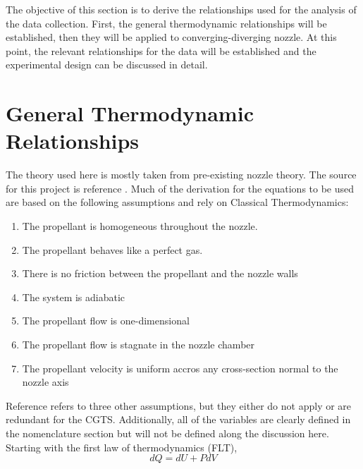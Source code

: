 The objective of this section is to derive the relationships used for the analysis of the data collection. First, the general thermodynamic relationships will be established, then they will be applied to converging-diverging nozzle. At this point, the relevant relationships for the data will be established and the experimental design can be discussed in detail.
\section{General Thermodynamic Relationships}
The theory used here is mostly taken from pre-existing nozzle theory. The source for this project is reference \cite{langton}. Much of the derivation for the equations to be used are based on the following assumptions and rely on Classical Thermodynamics:
\begin{enumerate}
\item The propellant is homogeneous throughout the nozzle.
\item The propellant behaves like a perfect gas.
\item There is no friction between the propellant and the nozzle walls
\item The system is adiabatic
\item The propellant flow is one-dimensional
\item The propellant flow is stagnate in the nozzle chamber
\item The propellant velocity is uniform accros any cross-section normal to the nozzle axis
\end{enumerate}
Reference \cite{langton} refers to three other assumptions, but they either do not apply or are redundant for the CGTS. Additionally, all of the variables are clearly defined in the nomenclature section but will not be defined along the discussion here.\\
Starting with the first law of thermodynamics (FLT),
\begin{equation}\label{eq:FLT}
dQ=dU+PdV
\end{equation}%
%
%
%
%
%
%
%
%
